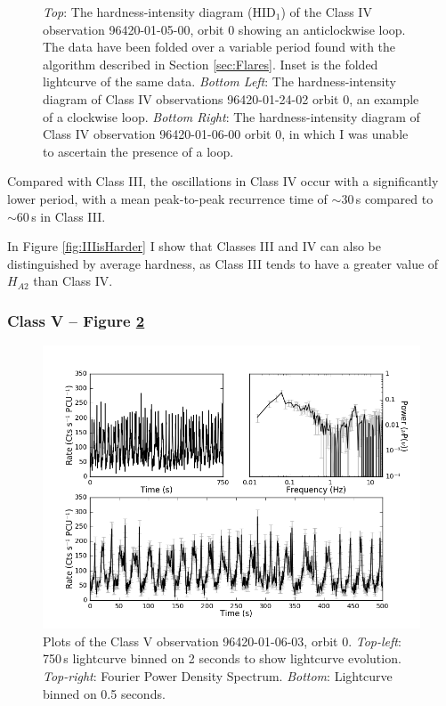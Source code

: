 \begin{figure}
    \captionsetup{singlelinecheck=off}
    \caption[The hardness-intensity diagram of the Class IV observation 96420-01-05-00, showing an anticlockwise loop.]{\textit{Top}: The hardness-intensity diagram (HID$_1$) of the Class IV observation 96420-01-05-00, orbit 0 showing an anticlockwise loop.  The data have been folded over a variable period found with the algorithm described in Section \ref{sec:Flares}.  Inset is the folded lightcurve of the same data.  \textit{Bottom Left}: The hardness-intensity diagram of Class IV observations 96420-01-24-02 orbit 0, an example of a clockwise loop.  \textit{Bottom Right}: The hardness-intensity diagram of Class IV observation 96420-01-06-00 orbit 0, in which I was unable to ascertain the presence of a loop.}
   \label{fig:LoopIV}
\end{figure}

\par Compared with Class III, the oscillations in Class IV occur with a significantly lower period, with a mean peak-to-peak recurrence time of $\sim30$\,s compared to $\sim60$\,s in Class III.
\par In Figure \ref{fig:IIIisHarder} I show that Classes III and IV can also be distinguished by average hardness, as Class III tends to have a greater value of $H_{A2}$ than Class IV.

\subsubsection{Class V -- Figure \ref{fig:Kmulti}}
\label{sec:classV}

\begin{figure}
    \includegraphics[width=0.8\columnwidth, trim = 0.6cm 0 3.9cm 0]{images/Kmulti.png}
    \captionsetup{singlelinecheck=off}
    \caption[Characteristic lightcurves and a power spectrum of Type V variability.]{Plots of the Class V observation 96420-01-06-03, orbit 0.  \textit{Top-left}: 750\,s lightcurve binned on 2 seconds to show lightcurve evolution.  \textit{Top-right}: Fourier Power Density Spectrum. \textit{Bottom}: Lightcurve binned on 0.5 seconds.}
   \label{fig:Kmulti}
\end{figure}

